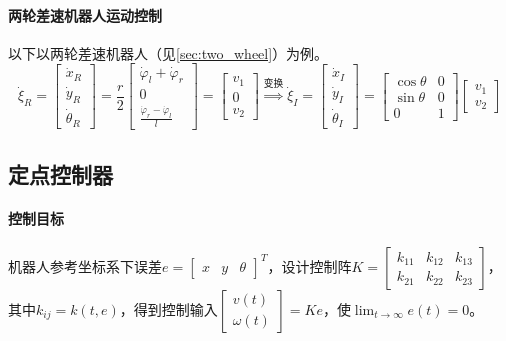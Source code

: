 \documentclass[
12pt, %
a4paper, 
oneside, %
headinclude,footinclude, %
]{scrartcl}
\begin{document}
\paragraph{两轮差速机器人运动控制}
以下以两轮差速机器人（见\ref{sec:two_wheel}）为例。
$$ 
\dot{\xi}_R = \begin{bmatrix} \dot{x}_R \\ \dot{y}_R \\ \dot{\theta}_R \end{bmatrix} = \frac{r}{2} \begin{bmatrix} \dot{\varphi}_l + \dot{\varphi}_r \\ 0 \\ \frac{\dot{\varphi}_r-\dot{\varphi}_l}{l} \end{bmatrix} = \begin{bmatrix} v_1 \\ 0 \\ v_2 \end{bmatrix} 
\overset{\text{变换}}{\Longrightarrow}
\dot{\xi}_I = \begin{bmatrix} \dot{x}_I \\ \dot{y}_I \\ \dot{\theta}_I \end{bmatrix} = \begin{bmatrix} \cos\theta & 0 \\ \sin\theta & 0 \\ 0 & 1 \end{bmatrix} \begin{bmatrix} v_1 \\ v_2 \end{bmatrix} 
$$
\subsection[定点控制器]{定点控制器}
\paragraph{控制目标}
机器人参考坐标系下误差$ e = \begin{bmatrix} x & y & \theta \end{bmatrix}^T $，设计控制阵$ K = \begin{bmatrix} k_{11} & k_{12} & k_{13} \\ k_{21} & k_{22} & k_{23} \end{bmatrix} $，其中$ k_{ij} = k(t, e) $，得到控制输入$ \begin{bmatrix} v(t) \\ \omega(t) \end{bmatrix} = Ke $，使$ \lim_{t \to \infty} e(t) = 0 $。
\end{document}
